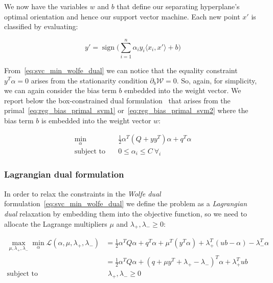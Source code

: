 We now have the variables $w$ and $b$ that define our separating hyperplane's optimal orientation and hence our support vector machine. Each new point $x'$ is classified by evaluating:

\begin{equation} \label{eq:svc_pred}
    y'=\operatorname{sign}\big(\sum_{i=1}^n\alpha_i y_i\langle x_i, x' \rangle+b\big)
\end{equation}

From~\eqref{eq:svc_min_wolfe_dual} we can notice that the equality constraint $y^T \alpha = 0$ arises from the stationarity condition $\partial_{{b}} \mathcal{W}=0$. So, again, for simplicity, we can again consider the bias term $b$ embedded into the weight vector. We report below the box-constrained dual formulation~\cite{hsu2002simple} that arises from the primal~\eqref{eq:reg_bias_primal_svm1} or~\eqref{eq:reg_bias_primal_svm2} where the bias term $b$ is embedded into the weight vector $w$:

\begin{equation} \label{eq:svc_min_bcqp_wolf_dual}
    \begin{aligned}
        \min_{\alpha} \quad & \frac{1}{2} \alpha^T (Q + yy^T)\alpha+q^T\alpha \\
            \text{subject to} \quad & 0\leq\alpha_i\leq C \ \forall_i
    \end{aligned}
\end{equation}

\subsubsection{Lagrangian dual formulation}

In order to relax the constraints in the \emph{Wolfe dual} formulation~\eqref{eq:svc_min_wolfe_dual} we define the problem as a \emph{Lagrangian dual} relaxation by embedding them into the objective function, so we need to allocate the Lagrange multipliers $\mu$ and $\lambda_+, \lambda_- \geq 0$:

\begin{equation} \label{eq:l1_svc_lagrangian_dual}
	\begin{aligned}
		    \max_{\mu,\lambda_+,\lambda_-} \min_{\alpha} \mathcal{L}(\alpha,\mu,\lambda_+,\lambda_-) &= \frac{1}{2} \alpha^T Q\alpha+q^T\alpha + \mu^T (y^T \alpha) + \lambda_+^T (ub - \alpha) - \lambda_-^T \alpha \\
    &= \frac{1}{2} \alpha^T Q\alpha + (q + \mu y^T + \lambda_+ - \lambda_-)^T \alpha + \lambda_+^T ub \\
    \text{subject to} \quad & \,\, \lambda_+, \lambda_- \geq 0
	\end{aligned}
\end{equation}

